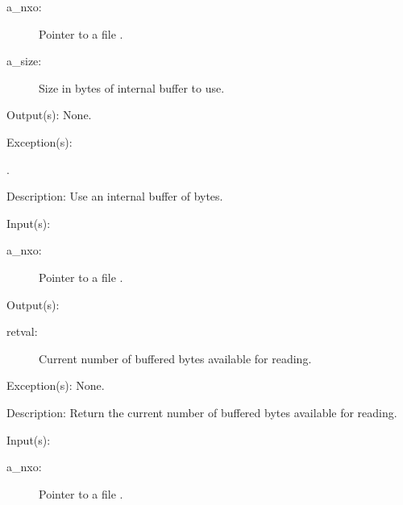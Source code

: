 \begin{capi}
\begin{capilist}
		\begin{description}\item[]
		\item[a\_nxo: ]
			Pointer to a file .
		\item[a\_size: ]
			Size in bytes of internal buffer to use.
		\end{description}
	\item[Output(s): ] None.
	\item[Exception(s): ]
		\begin{description}\item[]
		\item[.]
		\end{description}
	\item[Description: ]
		Use an internal buffer of  bytes.
	\end{capilist}
\label{nxo_file_buffer_count}
	\begin{capilist}
	\item[Input(s): ]
		\begin{description}\item[]
		\item[a\_nxo: ]
			Pointer to a file .
		\end{description}
	\item[Output(s): ]
		\begin{description}\item[]
		\item[retval: ]
			Current number of buffered bytes available for reading.
		\end{description}
	\item[Exception(s): ] None.
	\item[Description: ]
		Return the current number of buffered bytes available for
		reading.
	\end{capilist}
\label{nxo_file_buffer_flush}
	\begin{capilist}
	\item[Input(s): ]
		\begin{description}\item[]
		\item[a\_nxo: ]
			Pointer to a file \classname{nxo}.
		\end{description}

\end{capilist}
\end{capi}
